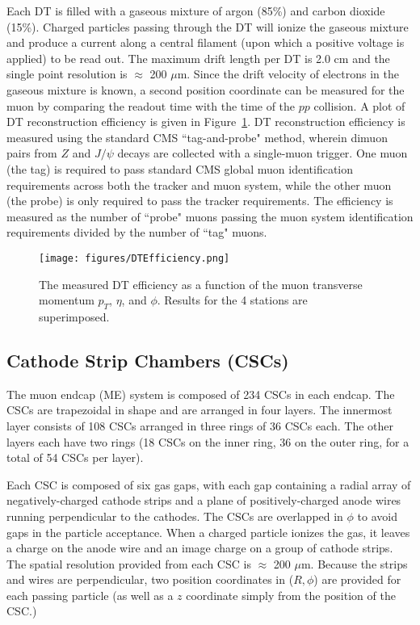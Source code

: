 Each DT is filled with a gaseous mixture of argon (85\%) and carbon dioxide (15\%). Charged particles passing through the DT will ionize the gaseous mixture and produce a current along a central filament (upon which a positive voltage is applied) to be read out. The maximum drift length per DT is 2.0 cm and the single point resolution is $\approx$ 200 $\mu$m. Since the drift velocity of electrons in the gaseous mixture is known, a second position coordinate can be measured for the muon by comparing the readout time with the time of the $pp$ collision. A plot of DT reconstruction efficiency is given in Figure~\ref{fig:DTEfficiency}\cite{TDR}. DT reconstruction efficiency is measured using the standard CMS ``tag-and-probe" method, wherein dimuon pairs from $Z$ and $J/\psi$ decays are collected with a single-muon trigger. One muon (the tag) is required to pass standard CMS global muon identification requirements across both the tracker and muon system, while the other muon (the probe) is only required to pass the tracker requirements. The efficiency is measured as the number of ``probe" muons passing the muon system identification requirements divided by the number of ``tag" muons\cite{Muon}.

\begin{figure}\centering
  \texttt{[image: figures/DTEfficiency.png]}
  \caption{\label{fig:DTEfficiency} The measured DT efficiency as a function of the muon transverse momentum $p_T$,
$\eta$, and $\phi$. Results for the 4 stations are superimposed.}
\end{figure}

\subsection{Cathode Strip Chambers (CSCs)}

The muon endcap (ME) system is composed of 234 CSCs in each endcap. The CSCs are trapezoidal in shape and are arranged in four layers. The innermost layer consists of 108 CSCs arranged in three rings of 36 CSCs each. The other layers each have two rings (18 CSCs on the inner ring, 36 on the outer ring, for a total of 54 CSCs per layer)\cite{Muon}.

Each CSC is composed of six gas gaps, with each gap containing a radial array of negatively-charged cathode strips and a plane of positively-charged anode wires running perpendicular to the cathodes. The CSCs are overlapped in $\phi$ to avoid gaps in the particle acceptance. When a charged particle ionizes the gas, it leaves a charge on the anode wire and an image charge on a group of cathode strips. The spatial resolution provided from each CSC is $\approx$ 200 $\mu$m. Because the strips and wires are perpendicular, two position coordinates in ($R, \phi$) are provided for each passing particle (as well as a $z$ coordinate simply from the position of the CSC.)

